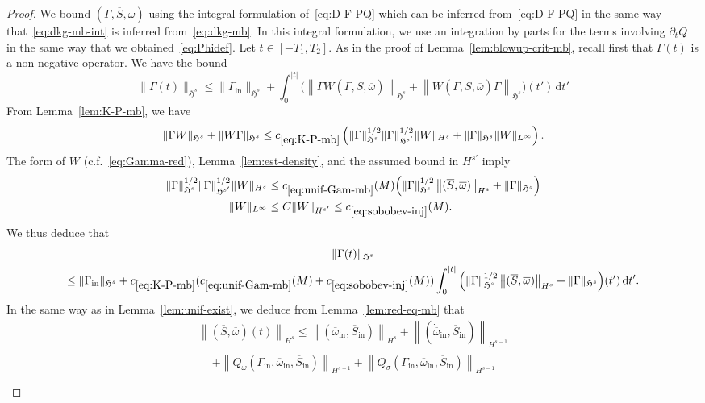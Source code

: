 \documentclass[10pt]{amsart}
\theoremstyle{definition}\newtheorem{defi}[theo]{Definition}\newtheorem{rema}[theo]{Remark}\newtheorem{exam}[theo]{Example}\newtheorem{exem}[theo]{Example}\newtheorem{nota}[theo]{Notation}
\newcommand{\rmin}{\mathrm{in}}
\renewcommand\bar{\overline}
\newcommand{\gH}{\mathfrak{H}}
\newcommand\ii{{\ensuremath {\infty}}}
\renewcommand\d[1]{{\ensuremath{\,\text{d}#1}}}
\begin{document}
\begin{proof}
We bound $(\Gamma,\bar{S},\bar{\omega})$ using the integral formulation of~\eqref{eq:D-F-PQ} which can be inferred from~\eqref{eq:D-F-PQ} in the same way that~\eqref{eq:dkg-mb-int} is inferred from~\eqref{eq:dkg-mb}. In this integral formulation, we use an integration by parts for the terms involving $\partial_t Q$ in the same way that we obtained~\eqref{eq:Phidef}. Let $t\in[-T_1,T_2]$. As in the proof of Lemma~\ref{lem:blowup-crit-mb}, recall first that $\Gamma(t)$ is a non-negative operator. We have the bound
\[
\|\Gamma(t)\|_{\gH^s} \leq
\|\Gamma_\rmin\|_{\gH^s} + \int_0^{|t|} \Big(\left\|\Gamma W(\Gamma, \overline{S}, \overline{\omega})\right\|_{\gH^s} +\left\|W(\Gamma, \overline{S}, \overline{\omega}) \Gamma \right\|_{\gH^s}\Big)(t') \d t'
\]
From Lemma~\ref{lem:K-P-mb}, we have
\[
\|\Gamma W \|_{\gH^s} +\|W \Gamma \|_{\gH^s}\leq c_{\eqref{eq:K-P-mb}} \left(\|\Gamma\|_{\gH^s}^{1/2}\|\Gamma\|_{\gH^{s'}}^{1/2} \|W\|_{H^s} + \|\Gamma\|_{\gH^s} \|W\|_{L^\infty} \right).
\]
The form of $W$ (c.f.~\eqref{eq:Gamma-red}), Lemma~\ref{lem:est-density}, and the assumed bound in $H^{s'}$ imply
\begin{align}\label{eq:unif-Gam-mb}
\|\Gamma\|_{\gH^s}^{1/2}\|\Gamma\|_{\gH^{s'}}^{1/2} \|W\|_{H^s} &\leq c_{\eqref{eq:unif-Gam-mb}}(M)\Big(\|\Gamma\|_{\gH^s}^{1/2}\left\|(\overline{S}, \overline{\omega})\right\|_{H^s} + \|\Gamma\|_{\gH^s}\Big) \\
\|W\|_{L^\ii}&\leq C\|W\|_{H^{s'}}\leq c_{\eqref{eq:sobobev-inj}}(M). \label{eq:sobobev-inj}
\end{align}
We thus deduce that
\begin{multline*}
\|\Gamma(t)\|_{\gH^s} \\
\leq
\|\Gamma_\rmin\|_{\gH^s} + c_{\eqref{eq:K-P-mb}}(c_{\eqref{eq:unif-Gam-mb}}(M)+c_{\eqref{eq:sobobev-inj}}(M))\int_0^{|t|} \Big(\|\Gamma\|_{\gH^s}^{1/2}\left\|(\overline{S}, \overline{\omega})\right\|_{H^s} + \|\Gamma\|_{\gH^s} \Big)(t') \d t'.
\end{multline*}
In the same way as in Lemma~\ref{lem:unif-exist}, we deduce from Lemma~\ref{lem:red-eq-mb} that
\begin{multline}
\left\|(\bar{S},\bar{\omega})(t)\right\|_{H^s} \leq
\left\|(\overline{\omega}_\rmin, \overline{S}_\rmin)\right\|_{H^s} + \left\|(\dot{\overline{\omega}}_\rmin, \dot{\overline{S}}_\rmin)\right\|_{H^{s-1}} \\
\begin{aligned}
&+\left\|Q_\omega(\Gamma_\rmin, \overline{\omega}_\rmin, \overline{S}_\rmin)\right\|_{H^{s-1}} + \left\|Q_\sigma(\Gamma_\rmin, \overline{\omega}_\rmin, \overline{S}_\rmin)\right\|_{H^{s-1}} \\

\end{aligned}
\end{multline}
\end{proof}
\end{document}
